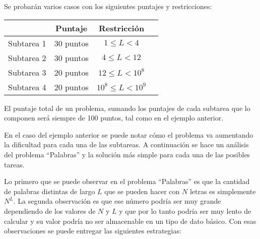 \begin{ejemplo}
Se probarán varios casos con los siguientes puntajes y restricciones: 
\begin{center} 
\begin{tabular}{|r|c|c|c} \hline
&{\bf Puntaje} & {\bf Restricción} \\ \hline
Subtarea 1 &30 puntos & $1\leq L<4$ \\
Subtarea 2 &30 puntos & $4\leq L< 12$ \\
Subtarea 3 &20 puntos & $12\leq L<10^8$ \\
Subtarea 4 &20 puntos & $10^8\leq L<10^9$ \\ \hline
\end{tabular}
\end{center}
\end{ejemplo}\bigskip

El puntaje total de un problema, sumando los puntajes de cada subtarea que lo componen
será siempre de 100 puntos, tal como en el ejemplo anterior.

En el caso del ejemplo anterior se puede notar cómo el problema va aumentando la dificultad
para cada una de las subtareas.
A continuación se hace un análisis del problema ``Palabras'' y la solución más
simple para cada una de las posibles tareas.

Lo primero que se puede observar en el problema ``Palabras'' es que la cantidad
de palabras distintas de largo $L$ que se pueden hacer con $N$ letras es
simplemente $N^L$.
La segunda observación es que ese número podría ser muy grande dependiendo de
los valores de $N$ y $L$ y que por lo tanto podría ser muy lento de calcular y 
su valor podría no ser almacenable en un tipo de dato básico.
Con esas observaciones se puede entregar las siguientes estrategias:

